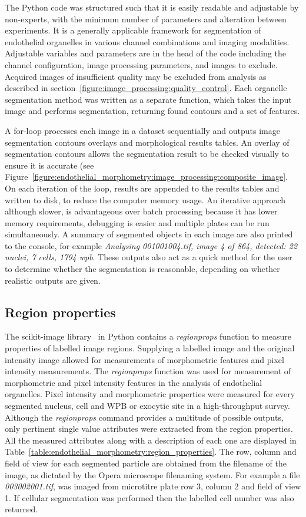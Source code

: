 The Python code was structured such that it is easily readable and adjustable by non-experts, with the minimum number of parameters and alteration between experiments. It is a generally applicable framework for segmentation of endothelial organelles in various channel combinations and imaging modalities. Adjustable variables and parameters are in the head of the code including the channel configuration, image processing parameters, and images to exclude. Acquired images of insufficient quality may be excluded from analysis as described in section~\ref{figure:image_processing:quality_control}. Each organelle segmentation method was written as a separate function, which takes the input image and performs segmentation, returning found contours and a set of features.

A for-loop processes each image in a dataset sequentially and outputs image segmentation contours overlays and morphological results tables. An overlay of segmentation contours allows the segmentation result to be checked visually to ensure it is accurate (see Figure~\ref{figure:endothelial_morphometry:image_processing:composite_image}. On each iteration of the loop, results are appended to the results tables and written to disk, to reduce the computer memory usage. An iterative approach although slower, is advantageous over batch processing because it has lower memory requirements, debugging is easier and multiple plates can be run simultaneously. A summary of segmented objects in each image are also printed to the console, for example \emph{Analysing 001001004.tif, image 4 of 864, detected: 22 nuclei, 7 cells, 1794 wpb}. These outputs also act as a quick method for the user to determine whether the segmentation is reasonable, depending on whether realistic outputs are given.

\subsection{Region properties}
\label{endothelial_morphometry:morphometric_measurements}
The scikit-image library~\cite{VanderWalt2014} in Python contains a \emph{regionprops} function to measure properties of labelled image regions. Supplying a labelled image and the original intensity image allowed for measurements of morphometric features and pixel intensity measurements. The \emph{regionprops} function was used for measurement of morphometric and pixel intensity features in the analysis of endothelial organelles. Pixel intensity and morphometric properties were measured for every segmented nucleus, cell and WPB or exocytic site in a high-throughput survey. Although the \emph{regionprops} command provides a multitude of possible outputs, only pertinent single value attributes were extracted from the region properties. All the measured attributes along with a description of each one are displayed in Table~\ref{table:endothelial_morphometry:region_properties}. The row, column and field of view for each segmented particle are obtained from the filename of the image, as dictated by the Opera microscope filenaming system. For example a file \emph{003002001.tif}, was imaged from microtitre plate row 3, column 2 and field of view 1. If cellular segmentation was performed then the labelled cell number was also returned.

